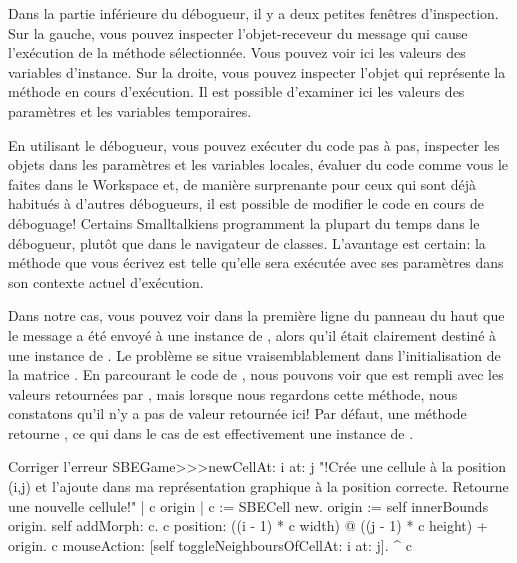 \documentclass[a4paper,10pt,twoside]{book}
\begin{document}
Dans la partie inférieure du débogueur, il y a deux petites fen\^etres
d'inspection. Sur la gauche, vous pouvez inspecter l'objet-receveur du message qui cause l'exécution de la méthode sélectionnée. Vous pouvez voir ici les valeurs des variables d'instance.
Sur la droite, vous pouvez inspecter l'objet qui représente la méthode en cours d'exécution. Il est possible d'examiner ici les valeurs des paramètres et les variables temporaires.

En utilisant le débogueur, vous pouvez exécuter du code pas à pas,
inspecter les objets dans les paramètres et les variables locales,
évaluer du code comme vous le faites dans le Workspace et, de manière
surprenante pour ceux qui sont déjà habitués à d'autres débogueurs, il
est possible de modifier le code en cours de déboguage! 
Certains Smalltalkiens programment la plupart du temps dans le
débogueur, plutôt que dans le navigateur de classes.
L'avantage est certain: la méthode que vous écrivez est telle
qu'elle sera exécutée \ie avec ses paramètres dans son contexte
actuel d'exécution.

Dans notre cas, vous pouvez voir dans la première ligne du panneau du haut que le message  a été envoyé à une instance de , alors qu'il était clairement destiné à une instance de .
Le problème se situe vraisemblablement dans l'initialisation de la matrice .
En parcourant le code de , nous pouvons
voir que  est rempli avec les valeurs retournées par
, mais lorsque nous regardons cette méthode, nous
constatons qu'il n'y a pas de valeur retournée ici!
Par défaut, une méthode retourne , ce qui dans le cas de  est effectivement une instance de .


\begin{method}{Corriger l'erreur}
SBEGame>>>newCellAt: i at: j
    "!Crée une cellule à la position (i,j) et l'ajoute dans ma représentation graphique à la position correcte. Retourne une nouvelle cellule!"
   | c origin |
   c := SBECell new.
   origin := self innerBounds origin.
   self addMorph: c.
   c position: ((i - 1) * c width) @ ((j - 1) * c height) + origin.
   c mouseAction: [self toggleNeighboursOfCellAt: i at: j].
   ^ c
\end{method}
\end{document}

